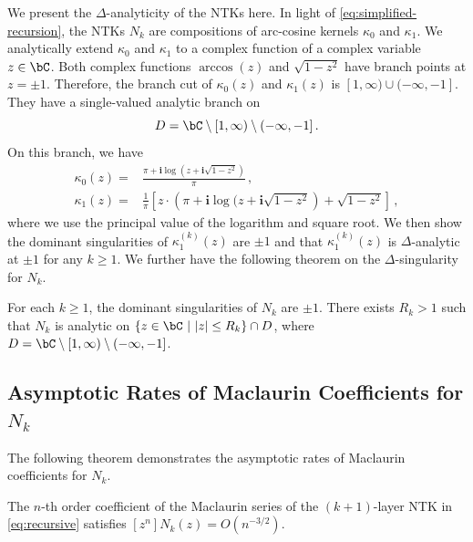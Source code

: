 \documentclass[11pt]{article}
\newcommand{\g}{\kappa_1}
\renewcommand{\i}{\mathbf{i}}
\begin{document}
We present the $\Delta$-analyticity of the NTKs here. In light of \eqref{eq:simplified-recursion}, the NTKs $N_k$ are compositions of arc-cosine kernels $\kappa_0$ and $\g$. 
We analytically extend $\kappa_0$ and $\kappa_1$ to a complex function of a complex variable $z\in \bC$. Both complex functions $\arccos(z)$ and $\sqrt{1-z^2}$ have branch points at $z=\pm 1$. Therefore, the branch cut of $\kappa_0(z)$ and $\kappa_1(z)$ is $[1,\infty)\cup (-\infty,-1]$. They have a single-valued analytic branch on \begin{equation}\label{eq:branch}
D = \bC\setminus [1,\infty) \setminus (-\infty,-1]\,.
\end{equation}
On this branch, we have \begin{align*}
\kappa_0(z) ={} & \frac{ \pi +\i\log(z+\i\sqrt{1-z^2})}{\pi}\,,\\
\g(z) ={} & \frac{1}{\pi}\left[ z\cdot \left( \pi +\i\log(z+\i\sqrt{1-z^2} \right) + \sqrt{1-z^2} \right]\,, 
\end{align*}
where we use the principal value of the logarithm and square root. We then show the dominant singularities of $\g^{(k)}(z)$ are $\pm 1$ and that $\g^{(k)}(z)$ is $\Delta$-analytic at $\pm 1$ for any $k\geq1$. We further have the following theorem on the $\Delta$-singularity for $N_k$. 

\begin{theorem}\label{thm:analytic_main}
  For each $k\geq 1$, the dominant singularities of $N_k$ are $\pm 1$. There exists $R_k>1$ such that $N_k$ is analytic on $\{z\in \bC~|~ |z|\le R_k\}\cap D$, where $D = \bC\setminus [1,\infty) \setminus (-\infty,-1] $.  
\end{theorem}









\subsection{Asymptotic Rates of Maclaurin Coefficients for $N_k$}\label{sec:AsympMac}
The following theorem demonstrates the asymptotic rates of Maclaurin coefficients for $N_k$. 

\begin{theorem}\label{thm:Kk}
The $n$-th order coefficient of the Maclaurin series of the $(k+1)$-layer NTK in \eqref{eq:recursive} satisfies $[z^n]N_k(z) = O(n^{-3/2})$.
\end{theorem}
\end{document}
